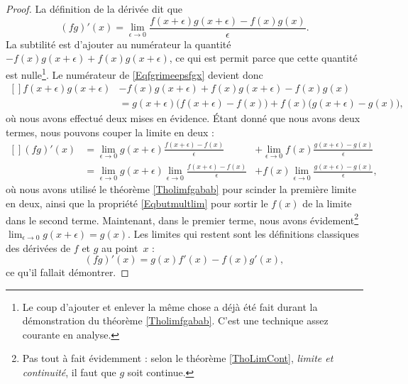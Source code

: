 \begin{proof}
La définition de la dérivée dit que
\begin{equation}		\label{Eqfgrimeepsfgx}
	(fg)'(x)=\lim_{\epsilon\to 0}\frac{f(x+\epsilon)g(x+\epsilon)-f(x)g(x)}{\epsilon}.
\end{equation}
La subtilité est d'ajouter au numérateur la quantité $-f(x)g(x+\epsilon)+f(x)g(x+\epsilon)$, ce qui est permit parce que cette quantité est nulle\footnote{Le coup d'ajouter et enlever la même chose a déjà été fait durant la démonstration du théorème \ref{Tholimfgabab}. C'est une technique assez courante en analyse.}. Le numérateur de \eqref{Eqfgrimeepsfgx} devient donc
\begin{equation}
	\begin{aligned}[]
f(x+\epsilon)g(x+\epsilon)&-f(x)g(x+\epsilon)+f(x)g(x+\epsilon)-f(x)g(x) \\
			&= g(x+\epsilon)\big( f(x+\epsilon)-f(x) \big)+f(x)\big( g(x+\epsilon)-g(x) \big),
	\end{aligned}
\end{equation}
où nous avons effectué deux mises en évidence. Étant donné que nous avons deux termes, nous pouvons couper la limite en deux :
\begin{equation}
	\begin{aligned}[]
		(fg)'(x)	&=\lim_{\epsilon\to 0}g(x+\epsilon)\frac{ f(x+\epsilon)-f(x) }{\epsilon} 			&+\lim_{\epsilon\to 0}f(x)\frac{ g(x+\epsilon)-g(x) }{\epsilon}\\
				&=\lim_{\epsilon\to 0}g(x+\epsilon)\lim_{\epsilon\to 0}\frac{ f(x+\epsilon)-f(x) }{\epsilon}	&+f(x)\lim_{\epsilon\to 0}\frac{ g(x+\epsilon)-g(x) }{\epsilon},
	\end{aligned}
\end{equation}
où nous avons utilisé le théorème \ref{Tholimfgabab} pour scinder la première limite en deux, ainsi que la propriété \eqref{Eqbutmultlim} pour sortir le $f(x)$ de la limite dans le second terme. Maintenant, dans le premier terme, nous avons évidement\footnote{Pas tout à fait évidemment : selon le théorème \ref{ThoLimCont}, \emph{limite et continuité}, il faut que $g$ soit continue.} $\lim_{\epsilon\to 0}g(x+\epsilon)=g(x)$. Les limites qui restent sont les définitions classiques des dérivées de $f$ et $g$ au point~$x$ :
\begin{equation}
	(fg)'(x)=g(x)f'(x)-f(x)g'(x),
\end{equation}
ce qu'il fallait démontrer.
\end{proof}

